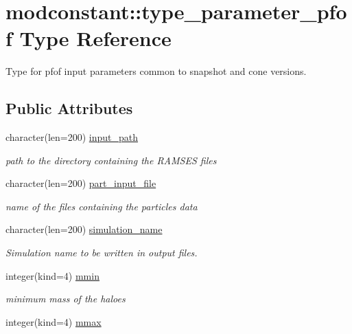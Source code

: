 \hypertarget{structmodconstant_1_1type__parameter__pfof}{\section{modconstant\-:\-:type\-\_\-parameter\-\_\-pfof Type Reference}
\label{structmodconstant_1_1type__parameter__pfof}
}


Type for pfof input parameters common to snapshot and cone versions.  


\subsection*{Public Attributes}
\begin{DoxyCompactItemize}
\item 
character(len=200) \hyperlink{structmodconstant_1_1type__parameter__pfof_a4ec6b9cf9beb861220a74b20d513dc99}{input\-\_\-path}
\begin{DoxyCompactList}\small\item\em path to the directory containing the R\-A\-M\-S\-E\-S files \end{DoxyCompactList}\item 
character(len=200) \hyperlink{structmodconstant_1_1type__parameter__pfof_ac6d921f4e7cea83883c15e106de98adf}{part\-\_\-input\-\_\-file}
\begin{DoxyCompactList}\small\item\em name of the files containing the particles data \end{DoxyCompactList}\item 
character(len=200) \hyperlink{structmodconstant_1_1type__parameter__pfof_a47ac45f599246d74572f1e8ca85803c0}{simulation\-\_\-name}
\begin{DoxyCompactList}\small\item\em Simulation name to be written in output files. \end{DoxyCompactList}\item 
integer(kind=4) \hyperlink{structmodconstant_1_1type__parameter__pfof_ac284b2b966517e18568a1410337b8bc5}{mmin}
\begin{DoxyCompactList}\small\item\em minimum mass of the haloes \end{DoxyCompactList}\item 
integer(kind=4) \hyperlink{structmodconstant_1_1type__parameter__pfof_a1140f2035cbceedd46862b69e347edf2}{mmax}

\end{DoxyCompactItemize}
